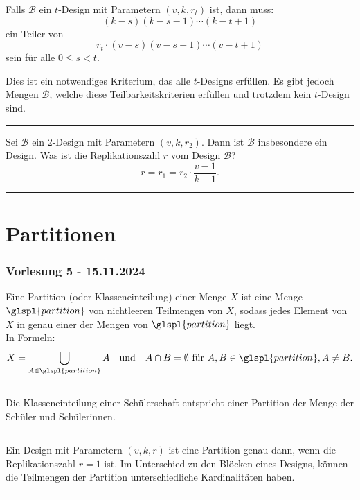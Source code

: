 \documentclass[9pt]{article}
\begin{document}
\begin{folg}
Falls $\mathcal{B}$ ein $t$-Design mit Parametern $(v, k, r_t)$ ist, dann muss:
\[
(k - s)(k - s - 1) \cdots (k - t + 1)
\]
ein Teiler von
\[
r_t \cdot (v - s)(v - s - 1) \cdots (v - t + 1)
\]
sein für alle $0 \leq s < t$.  

Dies ist ein notwendiges Kriterium, das alle $t$-Designs erfüllen. Es gibt jedoch Mengen $\mathcal{B}$, welche diese Teilbarkeitskriterien erfüllen und trotzdem kein $t$-Design sind.  
\end{folg} \noindent \rule{8cm}{0.4pt}

\begin{bsp}
Sei $\mathcal{B}$ ein 2-Design mit Parametern $(v, k, r_2)$. Dann ist $\mathcal{B}$ insbesondere ein Design.  
Was ist die Replikationszahl $r$ vom Design $\mathcal{B}$?  
\[
r = r_1 = r_2 \cdot \frac{v - 1}{k - 1}.
\]
\end{bsp} \noindent \rule{8cm}{0.4pt}




\section{Partitionen}
\subsubsection*{Vorlesung 5 - 15.11.2024}
\begin{defi}
Eine Partition (oder Klasseneinteilung) einer Menge \( X \) ist eine Menge \(\glspl{partition}\) von nichtleeren Teilmengen von \( X \), sodass jedes Element von \( X \) in genau einer der Mengen von \(\glspl{partition}\) liegt. \\
In Formeln:
\[
X = \bigcup_{A \in \glspl{partition}} A \quad \text{und} \quad A \cap B = \emptyset \text{ für } A, B \in \glspl{partition}, A \neq B.
\]
\end{defi} \noindent \rule{8cm}{0.4pt}
\begin{bsp}
Die Klasseneinteilung einer Schülerschaft entspricht einer Partition der Menge der Schüler und Schülerinnen.
\end{bsp} \noindent \rule{8cm}{0.4pt}

\begin{bem}
Ein Design mit Parametern \( (v, k, r) \) ist eine Partition genau dann, wenn die Replikationszahl \( r = 1 \) ist. Im Unterschied zu den Blöcken eines Designs, können die Teilmengen der Partition unterschiedliche Kardinalitäten haben.
\end{bem} \noindent \rule{8cm}{0.4pt}
\end{document}
